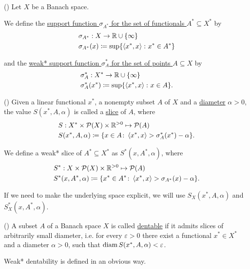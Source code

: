 \begin{definition}(\cite[Example 3.2(a)]{Phelps1993})
  \label{def:banach_support_function}
  Let $X$ be a Banach space.

  We define the \uline{support function $\sigma_{A^*}$ for the set of functionals $A^* \subseteq X^*$} by
  \begin{align*}
    &\sigma_{A^*}: X \to \mathbb{R} \cup \{ \infty \} \\
    &\sigma_{A^*}(x) \coloneqq \sup \{ \left\langle x^*, x \right\rangle \colon x^* \in A^* \}
  \end{align*}

  and the \uline{weak* support function $\sigma^*_A$ for the set of points $A \subseteq X$} by
  \begin{align*}
    &\sigma^*_A: X^* \to \mathbb{R} \cup \{ \infty \} \\
    &\sigma^*_A(x^*) \coloneqq \sup \{ \left\langle x^*, x \right\rangle \colon x \in A \}.
  \end{align*}
\end{definition}

\begin{definition}(\cite[definition 2.17]{Phelps1993})
  \label{def:banach_slice}
  Given a linear functional $x^*$, a nonempty subset $A$ of $X$ and a \uline{diameter} $\alpha > 0$, the value $S(x^*, A, \alpha)$ is called a \uline{slice} of $A$, where
  \begin{align*}
    &S: X^* \times \mathcal{P}(X) \times \mathbb{R}^{>0} \mapsto \mathcal{P}(A) \\
    &S(x^*, A, \alpha) \coloneqq \{ x \in A \colon \left\langle x^*, x \right\rangle > \sigma_A^*(x^*) - \alpha \}.
  \end{align*}

  We define a weak* slice of $A^* \subseteq X^*$ as $S^*(x, A^*, \alpha)$, where
  \begin{align*}
    &S^*: X \times \mathcal{P}(X) \times \mathbb{R}^{>0} \mapsto \mathcal{P}(A) \\
    &S^*(x, A^*, \alpha) \coloneqq \{ x^* \in A^* \colon \left\langle x^*, x \right\rangle > \sigma_{A^*}(x) - \alpha \}.
  \end{align*}

  If we need to make the underlying space explicit, we will use $S_X(x^*, A, \alpha)$ and $S_X^*(x, A^*, \alpha)$.
\end{definition}

\begin{definition}(\cite[definition 5.1]{Phelps1993})
  \label{def:dentability}
  A subset $A$ of a Banach space $X$ is called \uline{dentable} if it admits slices of arbitrarily small diameter, i.e. for every $\varepsilon > 0$ there exist a functional $x^* \in X^*$ and a diameter $\alpha > 0$, such that $\operatorname{diam} S(x^*, A, \alpha) < \varepsilon$.

  Weak* dentability is defined in an obvious way.
\end{definition}

